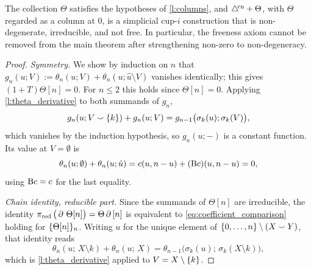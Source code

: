\documentclass{amsart}
\begin{document}
\begin{theorem}\label{t:non_deg_non_free}
	The collection $\Theta$ satisfies the hypotheses of \cref{l:columns}, and $\triangle^{\!\mathrm{cn}} + \Theta$, with $\Theta$ regarded as a column at $0$, is a simplicial \mbox{cup-$i$} construction that is non-degenerate, irreducible, and not free.
	In particular, the freeness axiom cannot be removed from the main theorem after strengthening non-zero to non-degeneracy.
\end{theorem}

\begin{proof}
	\textit{Symmetry.}
	We show by induction on $n$ that $g_n(u; V) := \theta_n(u; V) + \theta_n(u; \hat u \setminus V)$ vanishes identically; this gives $(1+T)\Theta[n] = 0$.
	For $n \leq 2$ this holds since $\Theta[n] = 0$.
	Applying \cref{l:theta_derivative} to both summands of $g_n$,
	\[
	g_n(u; V \union \set{k}) + g_n(u; V) = g_{n-1}\big(\sigma_k(u); \sigma_k(V)\big),
	\]
	which vanishes by the induction hypothesis, so $g_n(u; -)$ is a constant function.
	Its value at $V = \emptyset$ is
	\[
	\theta_n(u; \emptyset) + \theta_n(u; \hat u) =
	c(u, n-u) + (\mathrm{B} c)(u, n-u) = 0,
	\]
	using $\mathrm{B} c = c$ for the last equality.

	\medskip
	\textit{Chain identity, reducible part.}
	Since the summands of $\Theta[n]$ are irreducible, the identity $\operatorname{\pi_{\text{red}}}\big(\operatorname{\partial}\, \Theta[n]\big) = \Theta\operatorname{\partial}\,[n]$ is equivalent to \cref{eq:coefficient_comparison} holding for $\{\Theta[n]\}_n$.
	Writing $u$ for the unique element of $\set{0,\dots,n} \setminus (X \union Y)$, that identity reads
	\[
	\theta_n(u;\, X \setminus k) + \theta_n(u;\, X) =
	\theta_{n-1}\big(\sigma_k(u);\, \sigma_k(X \setminus k)\big),
	\]
	which is \cref{l:theta_derivative} applied to $V = X \setminus \{k\}$.


\end{proof}
\end{document}
